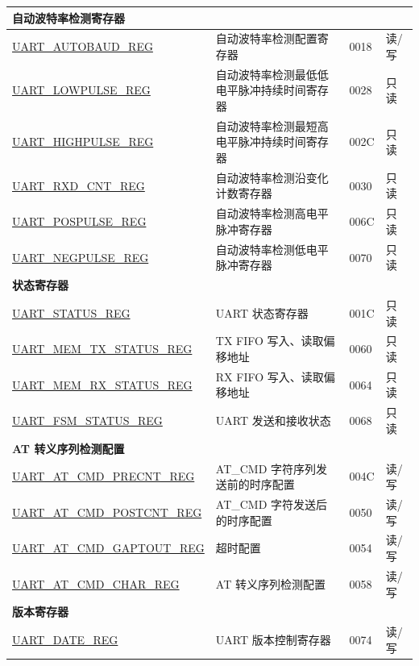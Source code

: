 \begin{longtable}{ | p{6cm} | p{7.2cm} | p{1.3cm} | p{1cm} | }
\multicolumn{4}{|l|}{\textbf{自动波特率检测寄存器}} \\ \hline
\hyperref[regdesc:UARTAUTOBAUDREG]{UART\_AUTOBAUD\_REG} & 自动波特率检测配置寄存器 & \hexprefix{}0018 & 读/写 \\ \hline
\hyperref[regdesc:UARTLOWPULSEREG]{UART\_LOWPULSE\_REG} & 自动波特率检测最低低电平脉冲持续时间寄存器 & \hexprefix{}0028 & 只读 \\ \hline
\hyperref[regdesc:UARTHIGHPULSEREG]{UART\_HIGHPULSE\_REG} & 自动波特率检测最短高电平脉冲持续时间寄存器 & \hexprefix{}002C & 只读 \\ \hline
\hyperref[regdesc:UARTRXDCNTREG]{UART\_RXD\_CNT\_REG} & 自动波特率检测沿变化计数寄存器 & \hexprefix{}0030 & 只读 \\ \hline
\hyperref[regdesc:UARTPOSPULSEREG]{UART\_POSPULSE\_REG} & 自动波特率检测高电平脉冲寄存器 & \hexprefix{}006C & 只读 \\ \hline
\hyperref[regdesc:UARTNEGPULSEREG]{UART\_NEGPULSE\_REG} & 自动波特率检测低电平脉冲寄存器 & \hexprefix{}0070 & 只读 \\ \hline
\multicolumn{4}{|l|}{\textbf{状态寄存器}} \\ \hline
\hyperref[regdesc:UARTSTATUSREG]{UART\_STATUS\_REG} & UART 状态寄存器 & \hexprefix{}001C & 只读 \\ \hline
\hyperref[regdesc:UARTMEMTXSTATUSREG]{UART\_MEM\_TX\_STATUS\_REG} & TX FIFO 写入、读取偏移地址 & \hexprefix{}0060 & 只读 \\ \hline
\hyperref[regdesc:UARTMEMRXSTATUSREG]{UART\_MEM\_RX\_STATUS\_REG} & RX FIFO 写入、读取偏移地址 & \hexprefix{}0064 & 只读 \\ \hline
\hyperref[regdesc:UARTFSMSTATUSREG]{UART\_FSM\_STATUS\_REG} & UART 发送和接收状态 & \hexprefix{}0068 & 只读 \\ \hline
\multicolumn{4}{|l|}{\textbf{AT 转义序列检测配置}} \\ \hline
\hyperref[regdesc:UARTATCMDPRECNTREG]{UART\_AT\_CMD\_PRECNT\_REG} & AT\_CMD 字符序列发送前的时序配置 & \hexprefix{}004C & 读/写 \\ \hline
\hyperref[regdesc:UARTATCMDPOSTCNTREG]{UART\_AT\_CMD\_POSTCNT\_REG} & AT\_CMD 字符发送后的时序配置 & \hexprefix{}0050 & 读/写 \\ \hline
\hyperref[regdesc:UARTATCMDGAPTOUTREG]{UART\_AT\_CMD\_GAPTOUT\_REG} & 超时配置 & \hexprefix{}0054 & 读/写 \\ \hline
\hyperref[regdesc:UARTATCMDCHARREG]{UART\_AT\_CMD\_CHAR\_REG} & AT 转义序列检测配置 & \hexprefix{}0058 & 读/写 \\ \hline
\multicolumn{4}{|l|}{\textbf{版本寄存器}} \\ \hline
\hyperref[regdesc:UARTDATEREG]{UART\_DATE\_REG} & UART 版本控制寄存器 & \hexprefix{}0074 & 读/写 \\ \hline
\end{longtable}
